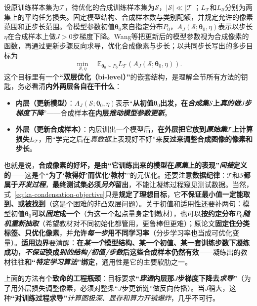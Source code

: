 设原训练样本集为$\mathcal T$，待优化的合成训练样本集为$\mathcal S$，$|\mathcal S|\ll|\mathcal T|$；$L_{\mathcal T}$和$L_{\mathcal S}$分别为两集上的平均任务损失。固定模型结构、合成样本数与类别配额，并规定允许的像素范围和正步长范围。令模型参数初值$\bm\theta_0$来自指定分布$P_0$，$A_J(\mathcal S;\bm\theta_0,\eta)$表示以步长$\eta$在合成样本上做$J>0$步梯度下降。Wang等把更新后的模型参数视为合成像素的函数，再通过更新步骤反向求导，优化合成像素与步长；以共同步长写出的多步目标为
\begin{equation}
  \min_{\mathcal S,\eta}\quad
  \mathbb E_{\bm\theta_0\sim P_0}
  L_{\mathcal T}\!\left(A_J(\mathcal S;\bm\theta_0,\eta)\right).
  \label{eq:ka-condensation-objective}
\end{equation}
这个目标里有一个\textbf{“双层优化（bi-level）”}的嵌套结构，是理解全节所有方法的钥匙，务必看清\textbf{内外两层各自在干什么}：
\begin{itemize}\item \textbf{内层（更新模型）}：$A_J(\mathcal{S};\bm{\theta}_0,\eta)$表示“\textbf{从初值$\bm{\theta}_0$出发，在\emph{合成集}$\mathcal{S}$上\emph{真的做$J$步梯度下降}}”——合成样本\textbf{在内层\emph{推动模型参数更新}}。\item \textbf{外层（更新合成样本）}：内层训出一个模型后，\textbf{在外层把它放到\emph{原始集}$\mathcal{T}$上计算损失}$L_{\mathcal{T}}$，用“学完之后在\emph{真数据}上表现好不好”来\textbf{反过来调整合成图像的像素和步长}。\end{itemize}
也就是说，\textbf{合成像素的好坏，是由“它训练出来的模型在\emph{原集}上的表现”\emph{间接}定义的}——这是个“\textbf{为了‘教得好’而优化‘教材’}”的元优化。还要注意\textbf{数据纪律}：$\mathcal{T}$和$\mathcal{S}$\textbf{都属于\emph{开发过程}}，\textbf{最终测试集必须\emph{另外}留出}，不能让凝练过程窥见测试数据。当然，式~\eqref{eq:ka-condensation-objective}只是\textbf{规定了理想目标}，它\textbf{不保证最小值一定能取到、或被找到}（这是个困难的非凸双层问题）。关于初值和适用性还要补两句：模型初值$\bm{\theta}_0$\textbf{可以\emph{固定}成一个}（为这一个起点量身定制教材），也可以\textbf{按约定分布$P_0$\emph{随机重新抽取}}（希望教材对不同初始化都管用，更鲁棒但更难）；原论文\textbf{固定住分类标签、只优化像素}，并\textbf{允许\emph{每一步}用不同学习率}（分步学习率也当成可优化变量）。\textbf{适用边界}要清醒：\textbf{在\emph{某一个}模型结构、某一个初值、某一套训练步数下凝练成功，\emph{不保证}换成\emph{别的结构/初值/步数}后这些合成样本仍然有效}——凝练出的教材往往\textbf{和“\emph{特定学习算法}”绑定}，通用性是它的主要软肋之一。

上面的方法有个\textbf{致命的工程瓶颈}：目标要求\textbf{“\emph{穿透}内层那$J$步梯度下降去\emph{求导}”}（为了用外层损失调整像素，必须对整条“$J$步更新链”做反向传播）。当$J$稍大，这种\textbf{“对训练过程求导”}\emph{计算图极深、显存和算力开销爆炸}，几乎不可行。

